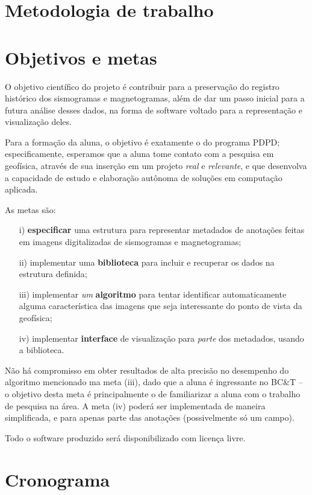 \documentclass{article}
\begin{document}
\section{Metodologia de trabalho}

\cite{gonzalez} \cite{petrou}


\section{Objetivos e metas}

O objetivo científico do projeto é contribuir para a preservação do
registro histórico dos sismogramas e magnetogramas, além de
dar um passo inicial para a futura análise desses dados, na forma de
software voltado para a representação e visualização deles.

Para a formação da aluna, o objetivo é exatamente o do programa PDPD;
especificamente, esperamos que a aluna tome contato com a pesquisa
em geofísica, através de sua inserção em um projeto {\em real} e
{\em relevante}, e que desenvolva a capacidade de estudo e elaboração
autônoma de soluções em computação aplicada.

As metas são:
\begin{itemize}
\item[i) ] {\bf especificar} uma estrutura para representar metadados de anotações feitas em imagens digitalizadas
  de sismogramas e magnetogramas;
\item[ii) ] implementar uma {\bf biblioteca} para incluir e recuperar os
  dados na estrutura definida;
\item[iii) ] implementar {\em um} {\bf algoritmo} para tentar identificar
  automaticamente alguma característica das imagens que seja
  interessante do ponto de vista da geofísica;
\item[iv) ] implementar {\bf interface} de visualização para {\em parte}
  dos metadados, usando a biblioteca.
\end{itemize}

Não há compromisso em obter resultados de alta precisão no desempenho
do algoritmo mencionado ma meta (iii), dado que a aluna é ingressante
no BC\&T -- o objetivo desta meta é principalmente o de familiarizar
a aluna com o trabalho de pesquisa na área.
A meta (iv) poderá ser implementada de maneira simplificada, e para
apenas parte das anotações (possivelmente só um campo).

Todo o software produzido será disponibilizado com licença livre.

\section{Cronograma}
\end{document}
